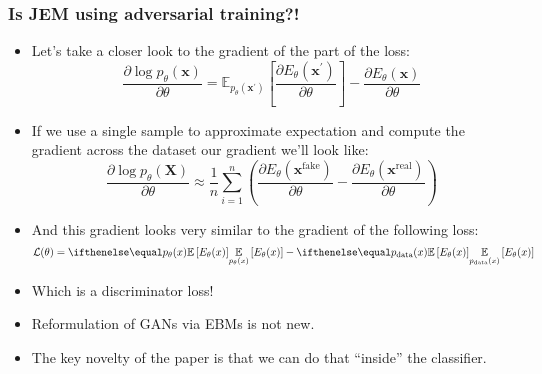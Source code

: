 \documentclass[10pt]{beamer}
\begin{document}
\begin{frame}
    \frametitle{Is JEM using adversarial training?!}
    \begin{itemize}
        \item\pause Let's take a closer look to the gradient of the part of the loss:
\begin{equation}
\frac{\partial \log p_{\theta}(\mathbf{x})}{\partial \theta}=\mathbb{E}_{p_{\theta}\left(\mathbf{x}^{\prime}\right)}\left[\frac{\partial E_{\theta}\left(\mathbf{x}^{\prime}\right)}{\partial \theta}\right]-\frac{\partial E_{\theta}(\mathbf{x})}{\partial \theta}
\end{equation}
    \item\pause If we use a single sample to approximate expectation and compute the gradient across the dataset our gradient we'll look like:
\begin{equation}
\frac{\partial \log p_{\theta}(\mathbf{X})}{\partial \theta} \approx \frac{1}{n}\sum_{i=1}^n\left(\frac{\partial E_{\theta}\left(\mathbf{x}^\text{fake}\right)}{\partial \theta}-\frac{\partial E_{\theta}(\mathbf{x}^\text{real})}{\partial \theta}\right)
\end{equation}
    \item\pause And this gradient looks very similar to the gradient of the following loss:
    \begin{equation}
        \mathcal{L}(\theta) = \expect[p_\theta(x)]{E_\theta(x)} - \expect[p_\text{data}(x)]{E_\theta(x)}
    \end{equation}
    \item\pause Which is a discriminator loss!
    \item\pause Reformulation of GANs via EBMs is not new.
    \item\pause The key novelty of the paper is that we can do that ``inside'' the classifier.
\end{itemize}
\end{frame}
\end{document}
